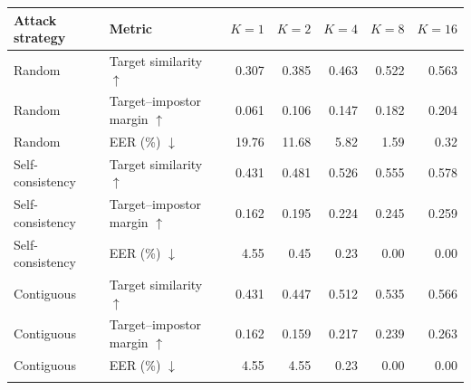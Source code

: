 \begin{tabular}{llrrrrr}
\toprule
Attack strategy & Metric & $K{=}1$ & $K{=}2$ & $K{=}4$ & $K{=}8$ & $K{=}16$ \\
\midrule
Random & Target similarity $\uparrow$ & 0.307 & 0.385 & 0.463 & 0.522 & 0.563 \\
Random & Target--impostor margin $\uparrow$ & 0.061 & 0.106 & 0.147 & 0.182 & 0.204 \\
Random & EER (\%) $\downarrow$ & 19.76 & 11.68 & 5.82 & 1.59 & 0.32 \\
\addlinespace
Self-consistency & Target similarity $\uparrow$ & 0.431 & 0.481 & 0.526 & 0.555 & 0.578 \\
Self-consistency & Target--impostor margin $\uparrow$ & 0.162 & 0.195 & 0.224 & 0.245 & 0.259 \\
Self-consistency & EER (\%) $\downarrow$ & 4.55 & 0.45 & 0.23 & 0.00 & 0.00 \\
\addlinespace
Contiguous & Target similarity $\uparrow$ & 0.431 & 0.447 & 0.512 & 0.535 & 0.566 \\
Contiguous & Target--impostor margin $\uparrow$ & 0.162 & 0.159 & 0.217 & 0.239 & 0.263 \\
Contiguous & EER (\%) $\downarrow$ & 4.55 & 4.55 & 0.23 & 0.00 & 0.00 \\
\addlinespace
\bottomrule
\end{tabular}
